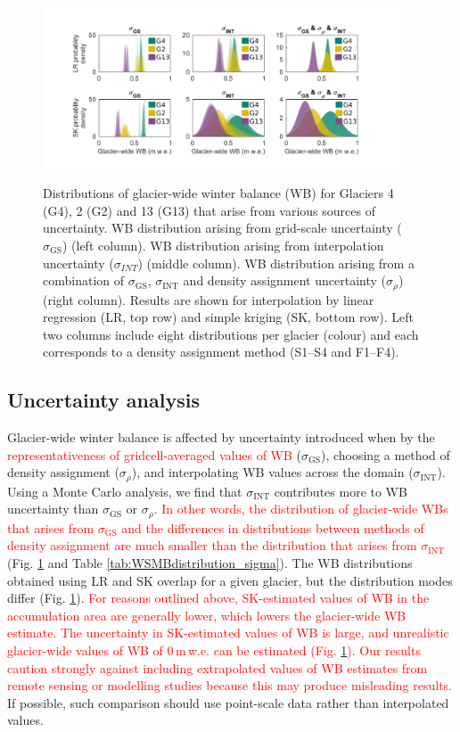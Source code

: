 \documentclass[review,oneside, letterpaper]{igs}
\begin{document}
\begin{figure}
	\centering
	\includegraphics[width =0.95\textwidth]{WSMBDist.pdf}\\
	\caption{Distributions of glacier-wide winter balance (WB) for Glaciers 4 (G4), 2 (G2) and 13 (G13) that arise from various sources of uncertainty. WB distribution arising from grid-scale uncertainty ($\sigma_{\mathrm{GS}}$) (left column). WB distribution arising from interpolation uncertainty ($\sigma_{INT}$) (middle column). WB distribution arising from a combination of $\sigma_{\mathrm{GS}}$, $\sigma_{\mathrm{INT}}$ and density assignment uncertainty ($\sigma_{\rho}$) (right column). Results are shown for interpolation by linear regression (LR, top row) and simple kriging (SK, bottom row). Left two columns include eight distributions per glacier (colour) and each corresponds to a density assignment method (S1--S4 and F1--F4).}
	\label{fig:WSMBDist_LR}
\end{figure}

\subsection{Uncertainty analysis}

Glacier-wide winter balance is affected by uncertainty introduced when by the \textcolor{red}{representativeness of gridcell-averaged values of WB} ($\sigma_{\mathrm{GS}}$), choosing a method of density assignment ($\sigma_{\rho}$), and interpolating WB values across the domain ($\sigma_{\mathrm{INT}}$). Using a Monte Carlo analysis, we find that $\sigma_{\mathrm{INT}}$ contributes more to WB uncertainty than $\sigma_{\mathrm{GS}}$ or $\sigma_{\rho}$. \textcolor{red}{In other words, the distribution of glacier-wide WBs that arises from $\sigma_{\mathrm{GS}}$ and the differences in distributions between methods of density assignment are much smaller than the distribution that arises from $\sigma_{\mathrm{INT}}$} (Fig. \ref{fig:WSMBDist_LR} and Table \ref{tab:WSMBdistribution_sigma}). The WB distributions obtained using LR and SK overlap for a given glacier, but the distribution modes differ (Fig. \ref{fig:WSMBDist_LR}). \textcolor{red}{For reasons outlined above, SK-estimated values of WB in the accumulation area are generally lower, which lowers the glacier-wide WB estimate.  The uncertainty in SK-estimated values of WB is large, and unrealistic glacier-wide values of WB of 0\,m\,w.e. can be estimated (Fig. \ref{fig:WSMBDist_LR}). Our results caution strongly against including extrapolated values of WB estimates from remote sensing or modelling studies because this may produce misleading results.} If possible, such comparison should use point-scale data rather than interpolated values. 
\end{document}
